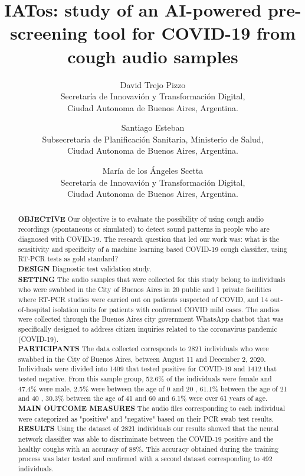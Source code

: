 \documentclass{nle}
\title[IATos]
      {IATos: study of an AI-powered pre-screening tool for COVID-19 from cough audio samples}
\author[D. Trejo Pizzo, S. Esteban and M. Scetta]
       {David Trejo Pizzo\\
        Secretaría de Innovavión y Transformación Digital,\\
        Ciudad Autonoma de Buenos Aires, Argentina.
        \and
        Santiago Esteban\\
        Subsecretaría de Planificación Sanitaria, Ministerio de Salud,\\
        Ciudad Autonoma de Buenos Aires, Argentina.
        \and
        María de los Ángeles Scetta\\
        Secretaría de Innovavión y Transformación Digital,\\
        Ciudad Autonoma de Buenos Aires, Argentina.}
\begin{document}
\label{firstpage}
\maketitle

\begin{abstract}

\textbf{OBJECTIVE} Our objective is to evaluate the possibility of using cough audio recordings  (spontaneous or simulated) to detect sound patterns in people who are diagnosed with COVID-19. The research question that led our work was: what is the sensitivity and specificity of a machine learning based COVID-19 cough classifier, using RT-PCR tests as gold standard?\\

\textbf{DESIGN} Diagnostic test validation study.\\

\textbf{SETTING} The audio samples that were collected for this study belong to individuals who were swabbed in the City of Buenos Aires in 20 public and 1 private facilities where RT-PCR studies were carried out on patients suspected of COVID, and 14 out-of-hospital isolation units for patients with confirmed COVID mild cases. The audios were collected through  the Buenos Aires city government WhatsApp chatbot that was specifically designed to address citizen inquiries related to the coronavirus pandemic (COVID-19).\\

\textbf{PARTICIPANTS} The data collected corresponds to 2821 individuals who were swabbed in the City of Buenos Aires, between August 11 and December 2, 2020. Individuals were divided into 1409 that tested positive for COVID-19 and 1412 that tested negative. From this sample group, 52.6\% of the individuals were female and 47.4\% were male. 2.5\% were between the age of 0 and 20 , 61.1\% between the age of 21 and 40 , 30.3\% between the age of 41 and 60 and 6.1\% were over 61 years of age.\\

\textbf{MAIN OUTCOME MEASURES} The audio files corresponding to each individual were categorized as "positive" and "negative" based on their PCR swab test results.\\

\textbf{RESULTS} Using the dataset of 2821 individuals our results showed that the neural network classifier was able to discriminate between the COVID-19 positive and the healthy coughs with an accuracy of 88\%. This accuracy obtained during the training process was later tested and confirmed with a second dataset corresponding to 492 individuals.\\


\end{abstract}
\end{document}
